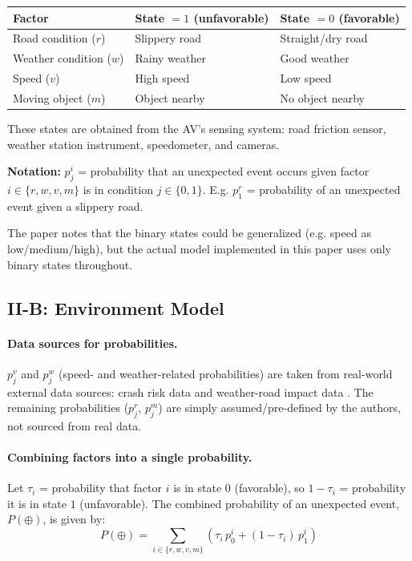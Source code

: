 \documentclass[11pt]{article}
\begin{document}
\begin{center}
\begin{tabular}{@{}lll@{}}
\toprule
Factor & State $=1$ (unfavorable) & State $=0$ (favorable) \\
\midrule
Road condition ($r$) & Slippery road & Straight/dry road \\
Weather condition ($w$) & Rainy weather & Good weather \\
Speed ($v$) & High speed & Low speed \\
Moving object ($m$) & Object nearby & No object nearby \\
\bottomrule
\end{tabular}
\end{center}

These states are obtained from the AV's sensing system: road friction sensor, weather
station instrument, speedometer, and cameras.

\begin{definitionbox}
\textbf{Notation:} $p^i_j$ = probability that an unexpected event occurs given factor
$i \in \{r,w,v,m\}$ is in condition $j \in \{0,1\}$. E.g. $p^r_1$ = probability of an
unexpected event given a slippery road.
\end{definitionbox}

\begin{remark}
The paper notes that the binary states could be generalized (e.g. speed as
low/medium/high), but the actual model implemented in this paper uses only binary
states throughout.
\end{remark}

\subsection{II-B: Environment Model}

\paragraph{Data sources for probabilities.} $p^v_j$ and $p^w_j$ (speed- and
weather-related probabilities) are taken from real-world external data sources: crash
risk data \cite{ref5} and weather-road impact data \cite{ref6}. The remaining
probabilities ($p^r_j$, $p^m_j$) are simply assumed/pre-defined by the authors, not
sourced from real data.

\paragraph{Combining factors into a single probability.} Let $\tau_i$ = probability
that factor $i$ is in state $0$ (favorable), so $1-\tau_i$ = probability it is in state
$1$ (unfavorable). The combined probability of an unexpected event, $P(\oplus)$, is
given by:
\begin{equation}
    P(\oplus) = \sum_{i \in \{r,w,v,m\}} \left( \tau_i \, p^i_0 + (1-\tau_i)\, p^i_1 \right)
    \label{eq:unexpected-event-prob}
\end{equation}
\end{document}
